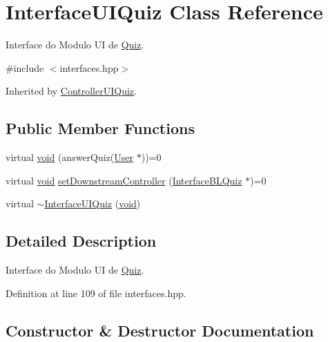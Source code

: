 \hypertarget{class_interface_u_i_quiz}{}\section{Interface\+U\+I\+Quiz Class Reference}
\label{class_interface_u_i_quiz}


Interface do Modulo UI de \hyperlink{class_quiz}{Quiz}.  




{\ttfamily \#include $<$interfaces.\+hpp$>$}



Inherited by \hyperlink{class_controller_u_i_quiz}{Controller\+U\+I\+Quiz}.

\subsection*{Public Member Functions}
\begin{DoxyCompactItemize}
\item 
virtual \hyperlink{class_interface_u_i_quiz_a8a3301246ca34b00553527afef00eb23}{void} (answer\+Quiz(\hyperlink{class_user}{User} $\ast$))=0
\item 
virtual \hyperlink{class_interface_u_i_quiz_a8a3301246ca34b00553527afef00eb23}{void} \hyperlink{class_interface_u_i_quiz_a599dff405ea117a75c7084c2dd08ee28}{set\+Downstream\+Controller} (\hyperlink{class_interface_b_l_quiz}{Interface\+B\+L\+Quiz} $\ast$)=0
\item 
virtual \hyperlink{class_interface_u_i_quiz_ad5b4765615f50a64c0795d7b774205df}{$\sim$\+Interface\+U\+I\+Quiz} (\hyperlink{class_interface_u_i_quiz_a8a3301246ca34b00553527afef00eb23}{void})
\end{DoxyCompactItemize}


\subsection{Detailed Description}
Interface do Modulo UI de \hyperlink{class_quiz}{Quiz}. 

Definition at line 109 of file interfaces.\+hpp.



\subsection{Constructor \& Destructor Documentation}
\mbox{\label{class_interface_u_i_quiz_ad5b4765615f50a64c0795d7b774205df}} 

